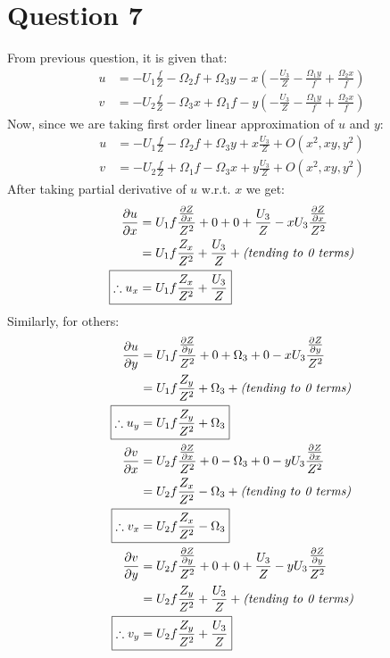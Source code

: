\documentclass{article}
\begin{document}
\section*{Question 7}
From previous question, it is given that:
\begin{align*}
u &= -U_1\frac{f}{Z} - \Omega_2f + \Omega_3y - x (-\frac{U_3}{Z} - \frac{\Omega_1y}{f}+\frac{\Omega_2x}{f}) \\
v &= -U_2\frac{f}{Z} - \Omega_3x + \Omega_1f - y (-\frac{U_3}{Z} - \frac{\Omega_1y}{f}+\frac{\Omega_2x}{f})
\end{align*}
Now, since we are taking first order linear approximation of $u$ and $y$:
\begin{align*}
u &= -U_1\frac{f}{Z} - \Omega_2f + \Omega_3y + x\frac{U_3}{Z} +O(x^2,xy,y^2) \\
v &= -U_2\frac{f}{Z} + \Omega_1f - \Omega_3x + y\frac{U_3}{Z} +O(x^2,xy,y^2)
\end{align*}
After taking partial derivative of $u$ w.r.t. $x$ we get:
\begin{align*}
\frac{\partial{u}}{\partial{x}} &= U_1f\frac{\frac{\partial{Z}}{\partial{x}}}{Z^2}
                                + 0 + 0 + \frac{U_3}{Z} - xU_3\frac{\frac{\partial{Z}}{\partial{x}}}{Z^2} \\
                                &= U_1f\frac{Z_x}{Z^2} + \frac{U_3}{Z} + \textit{(tending to 0 terms)} \\
\Aboxed{\therefore u_x &= U_1f\frac{Z_x}{Z^2} + \frac{U_3}{Z}}\\
\end{align*}
Similarly, for others:
\begin{align*}
\frac{\partial{u}}{\partial{y}} &= U_1f\frac{\frac{\partial{Z}}{\partial{y}}}{Z^2}
                                + 0 + \Omega_3 + 0 - xU_3\frac{\frac{\partial{Z}}{\partial{y}}}{Z^2} \\
                                &= U_1f\frac{Z_y}{Z^2} + \Omega_3 + \textit{(tending to 0 terms)} \\
\Aboxed{\therefore u_y &= U_1f\frac{Z_y}{Z^2} + \Omega_3}\\
\frac{\partial{v}}{\partial{x}} &= U_2f\frac{\frac{\partial{Z}}{\partial{x}}}{Z^2}
                                + 0 - \Omega_3 + 0 - yU_3\frac{\frac{\partial{Z}}{\partial{x}}}{Z^2} \\
                                &= U_2f\frac{Z_x}{Z^2} - \Omega_3 + \textit{(tending to 0 terms)} \\
\Aboxed{\therefore v_x &= U_2f\frac{Z_x}{Z^2} - \Omega_3}\\
\frac{\partial{v}}{\partial{y}} &= U_2f\frac{\frac{\partial{Z}}{\partial{y}}}{Z^2}
                                + 0 + 0 + \frac{U_3}{Z} - yU_3\frac{\frac{\partial{Z}}{\partial{y}}}{Z^2} \\
                                &= U_2f\frac{Z_y}{Z^2} + \frac{U_3}{Z} + \textit{(tending to 0 terms)} \\
\Aboxed{\therefore v_y &= U_2f\frac{Z_y}{Z^2} + \frac{U_3}{Z} }\\
\end{align*}
\end{document}
